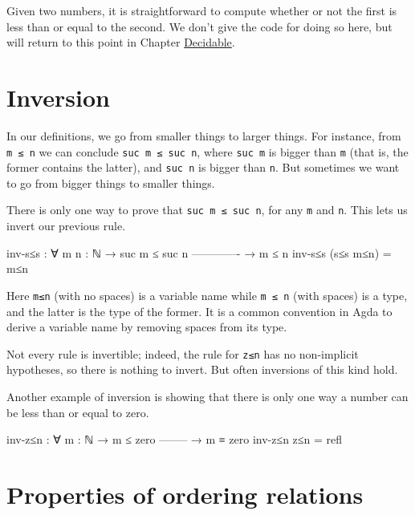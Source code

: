 Given two numbers, it is straightforward to compute whether or not the
first is less than or equal to the second. We don't give the code for
doing so here, but will return to this point in Chapter
\protect\hyperlink{Decidable}{Decidable}.

\hypertarget{inversion}{%
\section{Inversion}\label{inversion}}

In our definitions, we go from smaller things to larger things. For
instance, from \texttt{m\ ≤\ n} we can conclude
\texttt{suc\ m\ ≤\ suc\ n}, where \texttt{suc\ m} is bigger than
\texttt{m} (that is, the former contains the latter), and
\texttt{suc\ n} is bigger than \texttt{n}. But sometimes we want to go
from bigger things to smaller things.

There is only one way to prove that \texttt{suc\ m\ ≤\ suc\ n}, for any
\texttt{m} and \texttt{n}. This lets us invert our previous rule.

\begin{fence}
\begin{code}
inv-s≤s : ∀ {m n : ℕ}
  → suc m ≤ suc n
    -------------
  → m ≤ n
inv-s≤s (s≤s m≤n) = m≤n
\end{code}
\end{fence}

Here \texttt{m≤n} (with no spaces) is a variable name while
\texttt{m\ ≤\ n} (with spaces) is a type, and the latter is the type of
the former. It is a common convention in Agda to derive a variable name
by removing spaces from its type.

Not every rule is invertible; indeed, the rule for \texttt{z≤n} has no
non-implicit hypotheses, so there is nothing to invert. But often
inversions of this kind hold.

Another example of inversion is showing that there is only one way a
number can be less than or equal to zero.

\begin{fence}
\begin{code}
inv-z≤n : ∀ {m : ℕ}
  → m ≤ zero
    --------
  → m ≡ zero
inv-z≤n z≤n = refl
\end{code}
\end{fence}

\hypertarget{properties-of-ordering-relations}{%
\section{Properties of ordering
relations}\label{properties-of-ordering-relations}}

